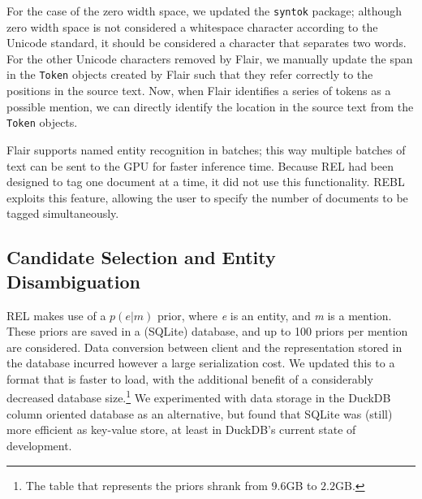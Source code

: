 For the case of the zero width space, we updated the \texttt{syntok} package; although zero width space is not considered a whitespace character according to the Unicode standard, it should be considered a character that separates two words. For the other Unicode characters removed by Flair, we manually update the span in the \texttt{Token} objects created by Flair such that they refer correctly to the positions in the source text. Now, when Flair identifies a series of tokens as a possible mention, we can directly identify the location in the source text from the \texttt{Token} objects.

Flair supports named entity recognition in batches; this way multiple batches of text can be sent to the GPU for faster inference time. Because REL had been designed to tag one document at a time, it did not use this functionality. REBL exploits this feature, allowing the user to specify the number of documents to be tagged simultaneously.

\subsection{Candidate Selection and Entity Disambiguation}
REL makes use of a $p(e|m)$ prior, where \textit{e} is an entity, and \textit{m} is a mention. These priors are saved in a (SQLite) database, and up to 100 priors per mention are considered. Data conversion between client and the representation stored in the database incurred however a large serialization cost. We updated this to a format that is faster to load, with the additional benefit of a considerably decreased database size.\footnote{The table that represents the priors shrank from $9.6$GB to $2.2$GB.}
We experimented with data storage in the DuckDB column oriented database as an alternative, but found that SQLite was (still) more efficient as key-value store, at least in DuckDB's current state of development.


